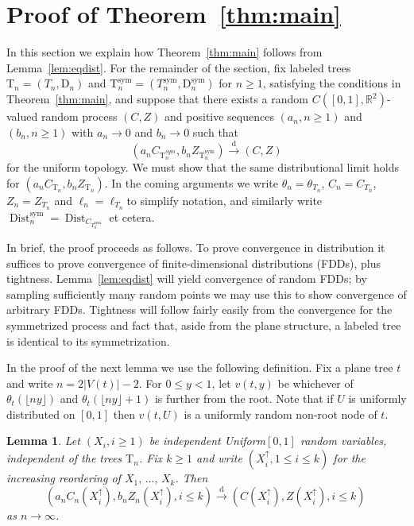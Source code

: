 \documentclass[10pt]{amsart}
\newtheorem{lemm}[theo]{Lemma}\newtheorem{prop}[theo]{Proposition}\newtheorem{coro}[theo]{Corollary}\newtheorem{conj}[theo]{Conjecture}
\theoremstyle{definition}\newtheorem{defi}[theo]{Definition}\newtheorem{rema}[theo]{Remark}\newtheorem{exam}[theo]{Example}\newtheorem{exem}[theo]{Example}\newtheorem{nota}[theo]{Notation}
\providecommand{\R}{}
\renewcommand{\R}{\mathbb{R}}
\newcommand{\rD}{\mathrm{D}}
\newcommand{\rT}{\mathrm{T}}
\DeclareMathOperator{\sym}{sym}
\DeclareMathOperator{\Dist}{Dist}
\newcommand{\unif}{\ensuremath{X}}
\newcommand{\convdist}{\ensuremath{\stackrel{\mathrm{d}}{\rightarrow}}}
\begin{document}
\section{Proof of Theorem~\ref{thm:main}}\label{sec:proofMain}
In this section we explain how Theorem~\ref{thm:main} follows from Lemma~\ref{lem:eqdist}. For the remainder of the section, fix labeled trees $\rT_n=(T_n,\rD_n)$ and $\rT_n^{\sym}=(T_n^{\sym},\rD_n^{\sym})$ for $n \ge 1$, satisfying the conditions in Theorem~\ref{thm:main}, and suppose that there exists a random $C([0,1],\R^2)$-valued random process $(C,Z)$ and positive sequences $(a_n,n \ge 1)$ and $(b_n,n \ge 1)$ with $a_n \to 0$ and $b_n \to 0$ such that
\[
\left(a_nC_{\rT_n^{sym}},b_nZ_{\rT_n^{\sym}}\right) \convdist (C,Z)
\]
for the uniform topology. We must show that the same distributional limit holds for $(a_nC_{\rT_n},b_nZ_{\rT_n})$. In the coming arguments we write $\theta_n=\theta_{T_n}$, $C_n=C_{T_n}$, $Z_n=Z_{T_n}$ and $\ell_n=\ell_{T_n}$to simplify notation, and similarly write $\Dist_n^{\sym} = \Dist_{C_{T_n^{\sym}}}$ et cetera.

In brief, the proof proceeds as follows. To prove convergence in distribution it suffices to prove convergence of finite-dimensional distributions (FDDs), plus tightness. Lemma~\ref{lem:eqdist} will yield convergence of random FDDs; by sampling sufficiently many random points we may use this to show convergence of arbitrary FDDs. Tightness will follow fairly easily from the convergence for the symmetrized process and fact that, aside from the plane structure, a labeled tree is identical to its symmetrization.


In the proof of the next lemma we use the following definition. Fix a plane tree $t$ and write $n=2|V(t)|-2$. For $0 \le y <1$, let $v(t,y)$ be whichever of $\theta_t(\lfloor n y \rfloor)$ and $\theta_t(\lfloor n y \rfloor+1)$ is further from the root. Note that if $U$ is uniformly distributed on $[0,1]$ then $v(t,U)$ is a uniformly random non-root node of $t$.
\begin{lemm}\label{lem:fdd}
Let $(\unif_i,i \ge 1)$ be independent Uniform$[0,1]$ random variables, independent of the trees $\rT_n$. Fix $k \ge 1$ and write $(\unif_i^\uparrow,1 \le i \le k)$ for the increasing reordering of $\unif_1,\,\ldots,\,\unif_k$. Then
\[
\left(a_n C_{n}\left(\unif_i^\uparrow\right), b_n Z_{n}\left(\unif_i^\uparrow\right),i \le k\right) \convdist \left(C\left(\unif_i^\uparrow\right),Z\left(\unif_i^\uparrow\right),i \le k\right)\,
\]
as $n \to \infty$.
\end{lemm}
\end{document}
